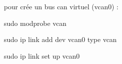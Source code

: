 pour crée un bus can virtuel (vcan0) \+:
\begin{DoxyItemize}
\item sudo modprobe vcan
\item sudo ip link add dev vcan0 type vcan
\item sudo ip link set up vcan0 
\end{DoxyItemize}
